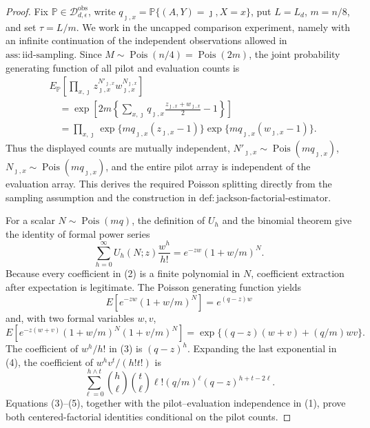 \documentclass{article}
\begin{document}
\begin{proof}
Fix \(\mathbb P\in\mathcal D_{d,\epsilon}^{\mathrm{obs}}\), write \(q_{\jmath,x}=\mathbb P\{(A,Y)=\jmath,X=x\}\), put \(L=L_d\), \(m=n/8\), and set \(\tau=L/m\).  We work in the uncapped comparison experiment, namely with an infinite continuation of the independent observations allowed in \(\mathrm{ass:iid\mbox{-}sampling}\).  Since \(M\sim\operatorname{Pois}(n/4)=\operatorname{Pois}(2m)\), the joint probability generating function of all pilot and evaluation counts is
\[
 \begin{split}
 &E_{\mathbb P}\!\left[
   \prod_{x,\jmath}z_{\jmath,x}^{N'_{\jmath,x}}
                      w_{\jmath,x}^{N_{\jmath,x}}
 \right]\\
 &\quad=\exp\!\left[
 2m\left\{\sum_{x,\jmath}q_{\jmath,x}
       \frac{z_{\jmath,x}+w_{\jmath,x}}2-1\right\}
 \right]\\
 &\quad=\prod_{x,\jmath}
   \exp\{mq_{\jmath,x}(z_{\jmath,x}-1)\}
   \exp\{mq_{\jmath,x}(w_{\jmath,x}-1)\}.
 \end{split}                                                     \tag{1}
\]
Thus the displayed counts are mutually independent, \(N'_{\jmath,x}\sim\operatorname{Pois}(mq_{\jmath,x})\), \(N_{\jmath,x}\sim\operatorname{Pois}(mq_{\jmath,x})\), and the entire pilot array is independent of the evaluation array.  This derives the required Poisson splitting directly from the sampling assumption and the construction in \(\mathrm{def:jackson\mbox{-}factorial\mbox{-}estimator}\).

For a scalar \(N\sim\operatorname{Pois}(mq)\), the definition of \(U_h\) and the binomial theorem give the identity of formal power series
\[
 \sum_{h=0}^{\infty}U_h(N;z)\frac{w^h}{h!}
 =e^{-zw}(1+w/m)^N.                                                \tag{2}
\]
Because every coefficient in (2) is a finite polynomial in \(N\), coefficient extraction after expectation is legitimate.  The Poisson generating function yields
\[
 E[e^{-zw}(1+w/m)^N]=e^{(q-z)w}                                   \tag{3}
\]
and, with two formal variables \(w,v\),
\[
 E\!\left[e^{-z(w+v)}(1+w/m)^N(1+v/m)^N\right]
 =\exp\{(q-z)(w+v)+(q/m)wv\}.                                    \tag{4}
\]
The coefficient of \(w^h/h!\) in (3) is \((q-z)^h\).  Expanding the last exponential in (4), the coefficient of \(w^hv^t/(h!t!)\) is
\[
 \sum_{\ell=0}^{h\wedge t}
 \binom h\ell\binom t\ell\ell!(q/m)^\ell
 (q-z)^{h+t-2\ell}.                                               \tag{5}
\]
Equations (3)--(5), together with the pilot--evaluation independence in (1), prove both centered-factorial identities conditional on the pilot counts.


\end{proof}
\end{document}
